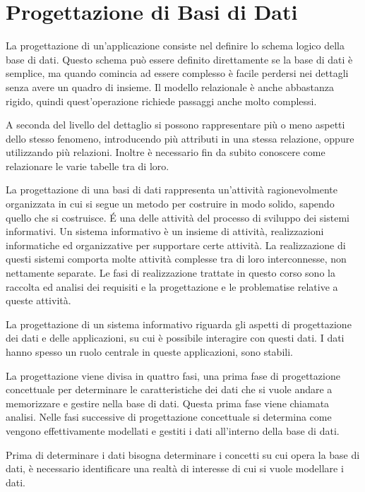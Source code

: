 \documentclass{article}
\numberwithin{equation}{subsection}
\begin{document}
\clearpage

\section{Progettazione di Basi di Dati}


La progettazione di un'applicazione consiste nel definire lo schema logico della base di dati. Questo schema può essere definito direttamente se la base di dati è 
semplice, ma quando comincia ad essere complesso è facile perdersi nei dettagli senza avere un quadro di insieme. Il modello relazionale è anche abbastanza rigido, 
quindi quest'operazione richiede passaggi anche molto complessi. 

A seconda del livello del dettaglio si possono rappresentare più o meno aspetti dello stesso fenomeno, introducendo più attributi in una stessa relazione, oppure 
utilizzando più relazioni. 
Inoltre è necessario fin da subito conoscere come relazionare le varie tabelle tra di loro. 

La progettazione di una basi di dati rappresenta un'attività ragionevolmente organizzata in cui si segue un metodo per costruire in modo solido, sapendo quello che 
si costruisce. \'{E} una delle attività del processo di sviluppo dei sistemi informativi. Un sistema informativo è un insieme di attività, realizzazioni informatiche 
ed organizzative per supportare certe attività. La realizzazione di questi sistemi comporta molte attività complesse tra di loro interconnesse, non nettamente 
separate. Le fasi di realizzazione trattate in questo corso sono la raccolta ed analisi dei requisiti e la progettazione e le problematise relative a queste attività. 

La progettazione di un sistema informativo riguarda gli aspetti di progettazione dei dati e delle applicazioni, su cui è possibile interagire con questi dati. I dati 
hanno spesso un ruolo centrale in queste applicazioni, sono stabili. 


La progettazione viene divisa in quattro fasi, una prima fase di progettazione concettuale per determinare le caratteristiche dei dati che si vuole andare a memorizzare 
e gestire nella base di dati. Questa prima fase viene chiamata analisi. Nelle fasi successive di progettazione concettuale si determina come vengono effettivamente 
modellati e gestiti i dati all'interno della base di dati.  

Prima di determinare i dati bisogna determinare i concetti su cui opera la base di dati, è necessario identificare una realtà di interesse di cui si vuole modellare 
i dati. 
\end{document}
